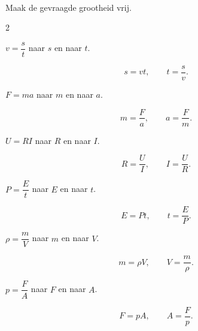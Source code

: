 \documentclass{ximera}
\begin{document}
\begin{oefening}{\oefB\ESS}
\\

Maak de gevraagde grootheid vrij.

\begin{multicols}{2}

\begin{question}
$v=\dfrac{s}{t}$ naar $s$ en naar $t$.

\begin{oplossing}
\[
s=vt,
\qquad
t=\dfrac{s}{v}.
\]
\end{oplossing}
\end{question}


\begin{question}
$F=ma$ naar $m$ en naar $a$.

\begin{oplossing}
\[
m=\dfrac{F}{a},
\qquad
a=\dfrac{F}{m}.
\]
\end{oplossing}
\end{question}


\begin{question}
$U=RI$ naar $R$ en naar $I$.

\begin{oplossing}
\[
R=\dfrac{U}{I},
\qquad
I=\dfrac{U}{R}.
\]
\end{oplossing}
\end{question}


\begin{question}
$P=\dfrac{E}{t}$ naar $E$ en naar $t$.

\begin{oplossing}
\[
E=Pt,
\qquad
t=\dfrac{E}{P}.
\]
\end{oplossing}
\end{question}


\begin{question}
$\rho=\dfrac{m}{V}$ naar $m$ en naar $V$.

\begin{oplossing}
\[
m=\rho V,
\qquad
V=\dfrac{m}{\rho}.
\]
\end{oplossing}
\end{question}


\begin{question}
$p=\dfrac{F}{A}$ naar $F$ en naar $A$.

\begin{oplossing}
\[
F=pA,
\qquad
A=\dfrac{F}{p}.
\]
\end{oplossing}
\end{question}



\end{multicols}
\end{oefening}
\end{document}
